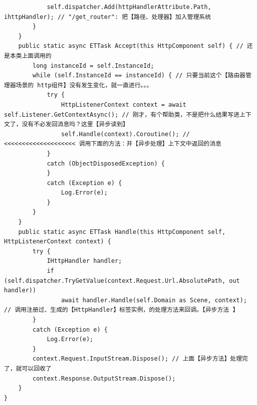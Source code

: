 \documentclass[9pt, b5paper]{article}
\begin{document}
\begin{verbatim}
            self.dispatcher.Add(httpHandlerAttribute.Path, ihttpHandler); // "/get_router": 把【路径、处理器】加入管理系统
        }
    }
    public static async ETTask Accept(this HttpComponent self) { // 还是本类上面调用的
        long instanceId = self.InstanceId;
        while (self.InstanceId == instanceId) { // 只要当前这个【路由器管理器场景的 http组件】没有发生变化，就一直进行。。。
            try {
                HttpListenerContext context = await self.Listener.GetContextAsync(); // 刚才，有个帮助类，不是把什么结果写进上下文了，没有不必发回消息吗？这里【异步读到】
                self.Handle(context).Coroutine(); // <<<<<<<<<<<<<<<<<<<< 调用下面的方法：并【异步处理】上下文中返回的消息 
            }
            catch (ObjectDisposedException) {
            }
            catch (Exception e) {
                Log.Error(e);
            }
        }
    }
    public static async ETTask Handle(this HttpComponent self, HttpListenerContext context) {
        try {
            IHttpHandler handler;
            if (self.dispatcher.TryGetValue(context.Request.Url.AbsolutePath, out handler)) 
                await handler.Handle(self.Domain as Scene, context); // 调用注册过、生成的【HttpHandler】标签实例，的处理方法来回调。【异步方法 】
        }
        catch (Exception e) {
            Log.Error(e);
        }
        context.Request.InputStream.Dispose(); // 上面【异步方法】处理完了，就可以回收了
        context.Response.OutputStream.Dispose();
    }
}
\end{verbatim}
\end{document}
